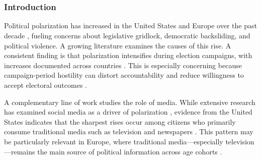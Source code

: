 \documentclass[12pt]{article}
\begin{document}
	







		\doparttoc %
	\faketableofcontents %
		\part{} %
		
	\thispagestyle{empty}   %
	\newpage                %
	\setcounter{page}{1}    %
	
	
	\clearpage
	

	

	

	
	
	\section{Introduction}
	
	
	
	


Political polarization has increased in the United States and Europe over the past decade \citep{IyengarLelkesLevendusky2019Origins,Reiljan2019FearAL}, fueling concerns about legislative gridlock, democratic backsliding, and political violence. A growing literature examines the causes of this rise. A consistent finding is that polarization intensifies during election campaigns, with increases documented across countries \citep{Hernndez2020AffectivePA}. This is especially concerning because campaign-period hostility can distort accountability and reduce willingness to accept electoral outcomes \citep{Gerber2006DoesTM}.

A complementary line of work studies the role of media. While extensive research has examined social media as a driver of polarization \citep[see, e.g.,][]{Zhuravskaya2020,bail2018exposure}, evidence from the United States indicates that the sharpest rises occur among citizens who primarily consume traditional media such as television and newspapers \citep{Boxell2020CrossCountryTI}. This pattern may be particularly relevant in Europe, where traditional media—especially television—remains the main source of political information across age cohorts \citep{eurobarometer2022}.
\end{document}
